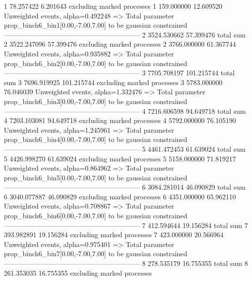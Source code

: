 1          78.257422       6.201643        excluding marked processes    
1          159.000000      12.609520       Unweighted events, alpha=0.492248
  => Total parameter prop_binch6_bin1[0.00,-7.00,7.00] to be gaussian constrained
------------------------------------------------------------
2          3524.530662     57.399476       total sum                     
2          3522.247096     57.399476       excluding marked processes    
2          3766.000000     61.367744       Unweighted events, alpha=0.935882
  => Total parameter prop_binch6_bin2[0.00,-7.00,7.00] to be gaussian constrained
------------------------------------------------------------
3          7705.708197     101.215744      total sum                     
3          7696.919925     101.215744      excluding marked processes    
3          5783.000000     76.046039       Unweighted events, alpha=1.332476
  => Total parameter prop_binch6_bin3[0.00,-7.00,7.00] to be gaussian constrained
------------------------------------------------------------
4          7216.606598     94.649718       total sum                     
4          7203.103081     94.649718       excluding marked processes    
4          5792.000000     76.105190       Unweighted events, alpha=1.245961
  => Total parameter prop_binch6_bin4[0.00,-7.00,7.00] to be gaussian constrained
------------------------------------------------------------
5          4461.472453     61.639024       total sum                     
5          4426.998270     61.639024       excluding marked processes    
5          5158.000000     71.819217       Unweighted events, alpha=0.864962
  => Total parameter prop_binch6_bin5[0.00,-7.00,7.00] to be gaussian constrained
------------------------------------------------------------
6          3084.281014     46.090829       total sum                     
6          3040.077887     46.090829       excluding marked processes    
6          4351.000000     65.962110       Unweighted events, alpha=0.708867
  => Total parameter prop_binch6_bin6[0.00,-7.00,7.00] to be gaussian constrained
------------------------------------------------------------
7          412.594644      19.156284       total sum                     
7          393.982891      19.156284       excluding marked processes    
7          423.000000      20.566964       Unweighted events, alpha=0.975401
  => Total parameter prop_binch6_bin7[0.00,-7.00,7.00] to be gaussian constrained
------------------------------------------------------------
8          278.535179      16.755355       total sum                     
8          261.353035      16.755355       excluding marked processes    
